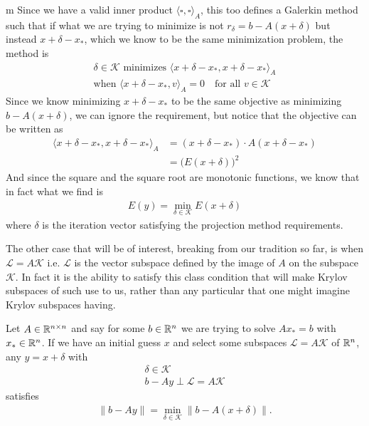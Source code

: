 \documentclass[11pt]{article}
\begin{document}
\begin{my proof}{m}
Since we have a valid inner product $\langle \square , \square \rangle_A$, this too defines a Galerkin method such that if what we are trying to minimize is not $r_\delta = b - A(x + \delta)$ but instead $x + \delta - x_*$, which we know to be the same minimization problem, the method is\begin{gather*}
\delta \in \mathcal{K} \text{ minimizes } \langle x + \delta - x_* , x + \delta - x_* \rangle_A \\
\text{when } \langle x + \delta - x_* , v \rangle_A = 0 \hspace{1em} \text{for all } v \in \mathcal{K}
\end{gather*}
Since we know minimizing $x + \delta - x_*$ to be the same objective as minimizing $b - A(x + \delta)$, we can ignore the requirement, but notice that the objective can be written as \begin{align*}
\langle x + \delta - x_* , x + \delta - x_* \rangle_A &= (x + \delta - x_*) \cdot A (x + \delta - x_*) \\
&= \big( E(x + \delta) \big)^2 
\end{align*}
And since the square and the square root are monotonic functions, we know that in fact what we find is \begin{gather*}
E(y) = \min_{\delta \in \mathcal K} E(x + \delta)
\end{gather*}
where $\delta$ is the iteration vector satisfying the projection method requirements.
\end{my proof}

The other case that will be of interest, breaking from our tradition so far, is when $\mathcal L = A \mathcal{K}$ i.e. $\mathcal L$ is the vector subspace defined by the image of $A$ on the subspace $\mathcal K$. In fact it is the ability to satisfy this class condition that will make Krylov subspaces of such use to us, rather than any particular  that one might imagine Krylov subspaces having.

\begin{proposition}
Let $A \in \mathbb{R}^{n \times n}$ and say for some $b \in \mathbb{R}^n$ we are trying to solve $A x_* = b$ with $x_* \in \mathbb{R}^n$. If we have an initial guess $x$ and select some subspaces $ \mathcal{L} = A \mathcal{K}$ of $\mathbb{R}^n$, any $y = x + \delta$ with\begin{gather*}
\delta \in \mathcal{K} \\
b - Ay \perp \mathcal{L} = A \mathcal{K}
\end{gather*}
satisfies \begin{gather*}
\lVert b - Ay \rVert = \min_{\delta \in \mathcal{K}} \lVert b - A(x + \delta) \rVert.
\end{gather*}
\end{proposition}
\end{document}

